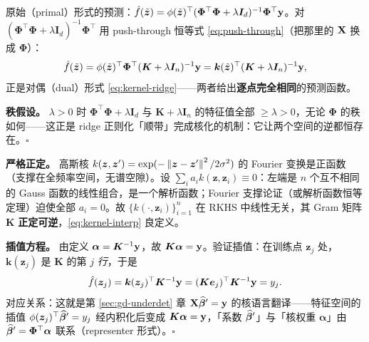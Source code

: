 \begin{description}[style=nextline, itemsep=1.2ex]
\item[练习 \ref{ex:kernel-dual}（核岭回归原始形式 $=$ 对偶形式）]
原始（primal）形式的预测：$\hat{f}(\tilde{\bm{z}}) = \phi(\tilde{\bm{z}})^\top(\bm{\Phi}^\top\bm{\Phi} + \lambda\bm{I}_d)^{-1}\bm{\Phi}^\top\mathbf{y}$。对 $(\bm{\Phi}^\top\bm{\Phi} + \lambda\bm{I}_d)^{-1}\bm{\Phi}^\top$ 用 push-through 恒等式 \eqref{eq:push-through}（把那里的 $\mathbf{X}$ 换成 $\bm{\Phi}$）：
\[
  \hat{f}(\tilde{\bm{z}})
  = \phi(\tilde{\bm{z}})^\top\bm{\Phi}^\top(\bm{K} + \lambda\bm{I}_n)^{-1}\mathbf{y}
  = \bm{k}(\tilde{\bm{z}})^\top(\bm{K} + \lambda\bm{I}_n)^{-1}\mathbf{y} ,
\]
正是对偶（dual）形式 \eqref{eq:kernel-ridge}——两者给出\textbf{逐点完全相同}的预测函数。

\textbf{秩假设。} $\lambda > 0$ 时 $\bm{\Phi}^\top\bm{\Phi} + \lambda\bm{I}_d$ 与 $\bm{K} + \lambda\bm{I}_n$ 的特征值全部 $\ge \lambda > 0$，无论 $\bm{\Phi}$ 的秩如何——这正是 ridge 正则化「顺带」完成核化的机制：它让两个空间的逆都恒存在。$\square$

\item[练习 \ref{ex:kernel-interp}（高斯核的正定性与插值方程）]
\textbf{严格正定。} 高斯核 $k(\bm{z},\bm{z}') = \exp(-\left\lVert \bm{z}-\bm{z}' \right\rVert^2/2\sigma^2)$ 的 Fourier 变换是正函数（支撑在全频率空间，无谱空隙）。设 $\sum_i a_i k(\bm{z},\bm{z}_i) \equiv 0$：左端是 $n$ 个互不相同的 Gauss 函数的线性组合，是一个解析函数；Fourier 支撑论证（或解析函数恒等定理）迫使全部 $a_i = 0$。故 $\{k(\cdot,\bm{z}_i)\}_{i=1}^n$ 在 RKHS 中线性无关，其 Gram 矩阵 $\bm{K}$ \textbf{正定可逆}，\eqref{eq:kernel-interp} 良定义。

\textbf{插值方程。} 由定义 $\bm{\alpha} = \bm{K}^{-1}\mathbf{y}$，故 $\bm{K}\bm{\alpha} = \mathbf{y}$。验证插值：在训练点 $\bm{z}_j$ 处，$\bm{k}(\bm{z}_j)$ 是 $\bm{K}$ 的第 $j$ \textit{行}，于是
\[
  \hat{f}(\bm{z}_j) = \bm{k}(\bm{z}_j)^\top\bm{K}^{-1}\mathbf{y} = (\bm{K}\bm{e}_j)^\top\bm{K}^{-1}\mathbf{y} = y_j .
\]
对应关系：这就是第 \ref{sec:gd-underdet} 章 $\mathbf{X}\widehat{\bm{\beta}}' = \mathbf{y}$ 的核语言翻译——特征空间的插值 $\phi(\bm{z}_j)^\top\widehat{\bm{\beta}}' = y_j$ 经内积化后变成 $\bm{K}\bm{\alpha} = \mathbf{y}$，「系数 $\widehat{\bm{\beta}}'$」与「核权重 $\bm{\alpha}$」由 $\widehat{\bm{\beta}}' = \bm{\Phi}^\top\bm{\alpha}$ 联系（representer 形式）。$\square$


\end{description}

